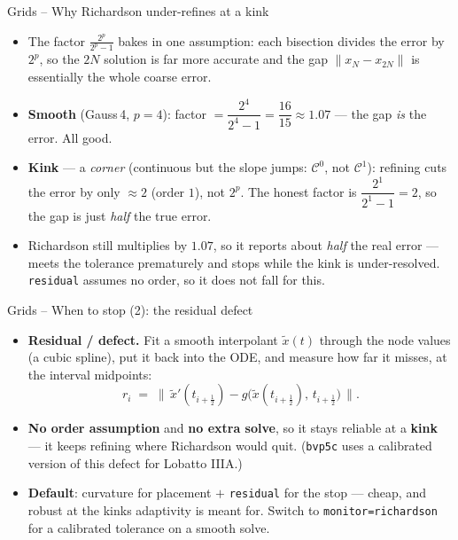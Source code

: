 \documentclass[11pt,aspectratio=169]{beamer}
\begin{document}
\begin{frame}{Grids -- Why Richardson under-refines at a kink}

\begin{itemize}

\item The factor $\tfrac{2^p}{2^p-1}$ bakes in one assumption: each bisection
  divides the error by $2^p$, so the $2N$ solution is far more accurate and
  the gap $\|x_N-x_{2N}\|$ is essentially the whole coarse error.\newline

\item \textbf{Smooth} (Gauss\,4, $p=4$): factor $=\dfrac{2^4}{2^4-1}=\dfrac{16}{15}\approx1.07$
  — the gap \emph{is} the error. All good.\newline

\item \textbf{Kink} — a \emph{corner} (continuous but the slope jumps: $\mathscr{C}^0$,
  not $\mathscr{C}^1$): refining cuts the error by only
  $\approx 2$ (order $1$), not $2^p$. The honest factor is
  $\dfrac{2^1}{2^1-1}=2$, so the gap is just \emph{half} the true error.\newline

\item Richardson still multiplies by $1.07$, so it reports about \emph{half}
  the real error — meets the tolerance prematurely and stops while the kink is
  under-resolved. \texttt{residual} assumes no order, so it does not fall for
  this.

\end{itemize}

\end{frame}

\begin{frame}{Grids -- When to stop (2): the residual defect}

\begin{itemize}

\item \textbf{Residual / defect.} Fit a smooth interpolant $\tilde x(t)$
  through the node values (a cubic spline), put it back into the ODE, and
  measure how far it misses, at the interval midpoints:
  \[
  r_i \;=\; \bigl\|\, \tilde x'(t_{i+\frac12}) - g\!\bigl(\tilde x(t_{i+\frac12}),\,t_{i+\frac12}\bigr) \,\bigr\| .
  \]

\item \textbf{No order assumption} and \textbf{no extra solve}, so it stays
  reliable at a \textbf{kink} — it keeps refining where Richardson would
  quit. (\texttt{bvp5c} uses a calibrated version of this defect for
  Lobatto IIIA.)\newline

\item \textbf{Default}: curvature for placement $+$ \texttt{residual} for the
  stop — cheap, and robust at the kinks adaptivity is meant for. Switch to
  \texttt{monitor=richardson} for a calibrated tolerance on a smooth solve.

\end{itemize}

\end{frame}
\end{document}

